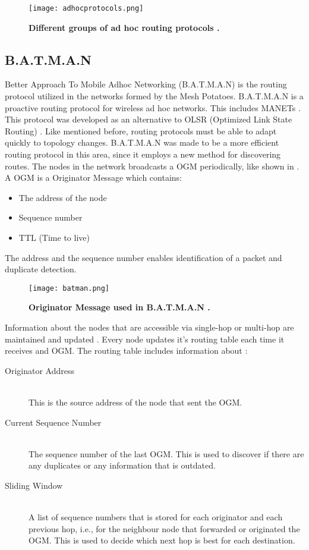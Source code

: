 \begin{figure}[t]
  \centering
    \texttt{[image: adhocprotocols.png]}
     \caption[Ad Hoc routing protocols]{\textbf{Different groups of ad hoc routing protocols \cite{adhoc}.}}
\label{fig:adhocprotocols}
\end{figure}


\subsection{B.A.T.M.A.N}
Better Approach To Mobile Adhoc Networking (B.A.T.M.A.N) is the routing protocol utilized in the networks formed by the Mesh Potatoes. B.A.T.M.A.N is a proactive routing protocol for wireless ad hoc networks. This includes MANETs \cite{batman}. This protocol was developed as an alternative to OLSR (Optimized Link State Routing) \cite{batman2}. Like mentioned before, routing protocols must be able to adapt quickly to topology changes. B.A.T.M.A.N was made to be a more efficient routing protocol in this area, since it employs a new method for discovering routes. The nodes in the network broadcasts a OGM periodically, like shown in . A OGM is a Originator Message which contains: 

\begin{itemize}
\item The address of the node
\item Sequence number
\item TTL (Time to live)
\end{itemize}

The address and the sequence number enables identification of a packet and duplicate detection. 

\begin{figure}[b]
  \centering
    \texttt{[image: batman.png]}
     \caption[Originator Message in B.A.T.M.A.N]{\textbf{Originator Message used in B.A.T.M.A.N \cite{batman2}.}}
\label{fig:batman} 
\end{figure}


Information about the nodes that are accessible via single-hop or multi-hop are maintained and updated \cite{batman}. Every node updates it's routing table each time it receives and OGM. The routing table includes information about \cite{batman2}:

\begin{description}
  \item[Originator Address] \hfill \\
  This is the source address of the node that sent the OGM.
  \item[Current Sequence Number] \hfill \\
  The sequence number of the last OGM. This is used to discover if there are any duplicates or any information that is outdated.
  \item[Sliding Window] \hfill \\
  A list of sequence numbers that is stored for each originator and each previous hop, i.e., for the neighbour node that forwarded or originated the OGM. This is used to decide which next hop is best for each destination. 
\end{description}

